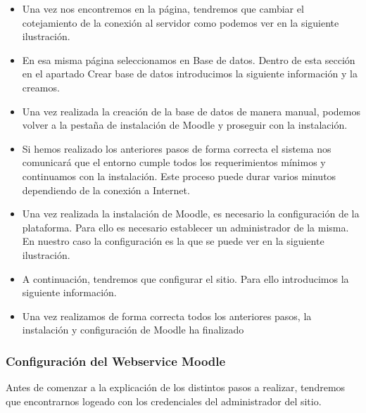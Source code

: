\begin{itemize}
	\item Una vez nos encontremos en la página, tendremos que cambiar el cotejamiento de la conexión al servidor como podemos ver en la siguiente ilustración.
	
	\item En esa misma página seleccionamos en Base de datos. Dentro de esta sección en el apartado Crear base de datos introducimos la siguiente información y la creamos. 
	
	\item Una vez realizada la creación de la base de datos de manera manual, podemos volver a la pestaña de instalación de Moodle y proseguir con la instalación.

	\item Si hemos realizado los anteriores pasos de forma correcta el sistema nos comunicará que el entorno cumple todos los requerimientos mínimos y continuamos con la instalación. Este proceso puede durar varios minutos dependiendo de la conexión a Internet.
	
	\item Una vez realizada la instalación de Moodle, es necesario la configuración de la plataforma. Para ello es necesario establecer un administrador de la misma. En nuestro caso la configuración es la que se puede ver en la siguiente ilustración. 
	
	\item A continuación, tendremos que configurar el sitio. Para ello introducimos la siguiente información. 
	
	\item Una vez realizamos de forma correcta todos los anteriores pasos, la instalación y configuración de Moodle ha finalizado

\end{itemize}

\subsubsection{Configuración del Webservice Moodle}

Antes de comenzar a la explicación de los distintos pasos a realizar, tendremos que encontrarnos logeado con los credenciales del administrador del sitio.


